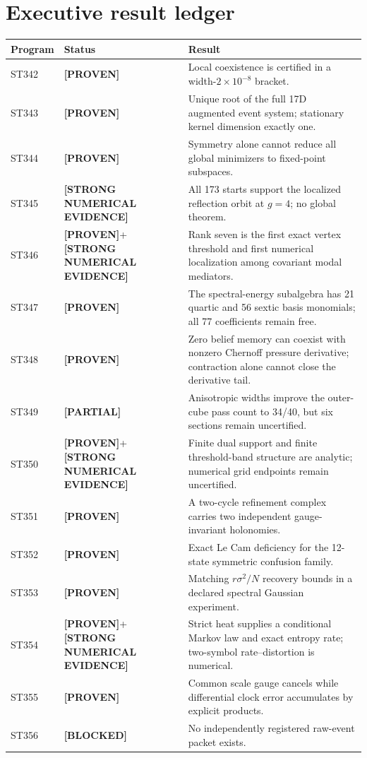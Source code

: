 \documentclass[11pt,a4paper]{article}
\newcommand{\Proven}{\textcolor{proved}{\textbf{[PROVEN]}}}
\newcommand{\Evidence}{\textcolor{conditional}{\textbf{[STRONG NUMERICAL EVIDENCE]}}}
\newcommand{\Partial}{\textcolor{conditional}{\textbf{[PARTIAL]}}}
\newcommand{\Blocked}{\textcolor{blocked}{\textbf{[BLOCKED]}}}
\begin{document}
\section{Executive result ledger}
\small
\begin{longtable}{p{}p{}p{}}
\toprule Program&Status&Result\\\midrule\endhead
ST342&\Proven&Local coexistence is certified in a width-$2\times10^{-8}$ bracket.\\
ST343&\Proven&Unique root of the full 17D augmented event system; stationary kernel dimension exactly one.\\
ST344&\Proven&Symmetry alone cannot reduce all global minimizers to fixed-point subspaces.\\
ST345&\Evidence&All 173 starts support the localized reflection orbit at $g=4$; no global theorem.\\
ST346&\Proven{}+\Evidence&Rank seven is the first exact vertex threshold and first numerical localization among covariant modal mediators.\\
ST347&\Proven&The spectral-energy subalgebra has 21 quartic and 56 sextic basis monomials; all 77 coefficients remain free.\\
ST348&\Proven&Zero belief memory can coexist with nonzero Chernoff pressure derivative; contraction alone cannot close the derivative tail.\\
ST349&\Partial&Anisotropic widths improve the outer-cube pass count to 34/40, but six sections remain uncertified.\\
ST350&\Proven{}+\Evidence&Finite dual support and finite threshold-band structure are analytic; numerical grid endpoints remain uncertified.\\
ST351&\Proven&A two-cycle refinement complex carries two independent gauge-invariant holonomies.\\
ST352&\Proven&Exact Le Cam deficiency for the 12-state symmetric confusion family.\\
ST353&\Proven&Matching $r\sigma^2/N$ recovery bounds in a declared spectral Gaussian experiment.\\
ST354&\Proven{}+\Evidence&Strict heat supplies a conditional Markov law and exact entropy rate; two-symbol rate--distortion is numerical.\\
ST355&\Proven&Common scale gauge cancels while differential clock error accumulates by explicit products.\\
ST356&\Blocked&No independently registered raw-event packet exists.\\
\bottomrule
\end{longtable}\normalsize
\end{document}
